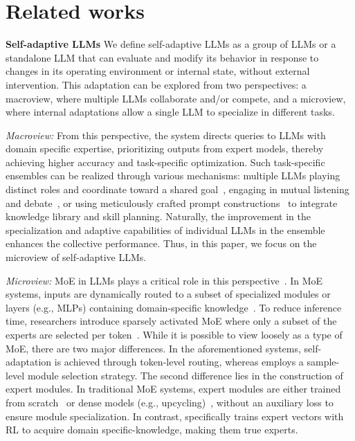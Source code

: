 \section{Related works}
\label{sec:relatedworks}

\textbf{Self-adaptive LLMs} We define self-adaptive LLMs as a group of LLMs or a standalone LLM that can evaluate and modify its behavior in response to changes in its operating environment or internal state, without external intervention.
This adaptation can be explored from two perspectives: a macroview, where multiple LLMs collaborate and/or compete, and a microview, where internal adaptations allow a single LLM to specialize in different tasks.

\textit{Macroview:} From this perspective, the system directs queries to LLMs with domain specific expertise, prioritizing outputs from expert models, thereby achieving higher accuracy and task-specific optimization.
Such task-specific ensembles can be realized through various mechanisms: multiple LLMs playing distinct roles and coordinate toward a shared goal~\citep{zhuge2023mindstorms}, engaging in mutual listening and debate~\citep{du2023improving}, or using meticulously crafted prompt constructions~\citep{zhang2024proagent} to integrate knowledge library and skill planning.
Naturally, the improvement in the specialization and adaptive capabilities of individual LLMs in the ensemble enhances the collective performance.
Thus, in this paper, we focus on the microview of self-adaptive LLMs.

\textit{Microview:} MoE in LLMs plays a critical role in this perspective~\citep{ICML2024_MoE}.
In MoE systems, inputs are dynamically routed to a subset of specialized modules or layers (e.g., MLPs) containing domain-specific knowledge~\citep{rajbhandari2022deepspeed,fedus2022switch}.
To reduce inference time, researchers introduce sparsely activated MoE where only a subset of the experts are selected per token~\cite{jiang2024mixtral,qwen_team_2024}.
While it is possible to view \implname loosely as a type of MoE, there are two major differences.
In the aforementioned systems, self-adaptation is achieved through token-level routing, whereas \implname employs a sample-level module selection strategy.
The second difference lies in the construction of expert modules.
In traditional MoE systems, expert modules are either trained from scratch~\citep{fedus2022switch,jiang2024mixtral} or dense models (e.g., upcycling)~\citep{qwen_team_2024,zhu2024llama}, without an auxiliary loss to ensure module specialization.
In contrast, \implname specifically trains expert vectors with RL to acquire domain specific-knowledge, making them true experts.

